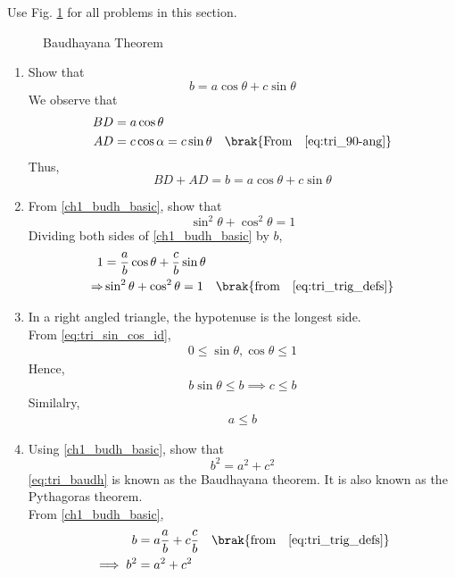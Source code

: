 Use Fig. \ref{fig:tri_baudh} for all problems in this section.
\begin{figure}[!ht]
	\begin{center}
		\resizebox{\columnwidth}{!}{}
	\end{center}
	\caption{Baudhayana Theorem}
	\label{fig:tri_baudh}	
\end{figure}
\renewcommand{\theequation}{\theenumi}
\begin{enumerate}[label=\thesection.\arabic*.,ref=\thesection.\theenumi]

%
\item
Show that 
%
\begin{equation}
\label{ch1_budh_basic}
b = a \cos \theta + c \sin \theta
\end{equation}
%
\solution We observe that
%
\begin{align}
BD &= a \cos \theta \\
AD &= c \cos\alpha = c \sin \theta \quad \brak{\text{From} \quad \eqref{eq:tri_90-ang}
}
\end{align}
%
Thus,
\begin{equation}
BD + AD = b = a \cos \theta + c \sin \theta
\end{equation}
\item
From \eqref{ch1_budh_basic}, show that
%
\begin{equation}
%
\label{eq:tri_sin_cos_id}
\sin ^2 \theta + \cos ^2 \theta = 1
\end{equation}
%
\solution Dividing both sides of \eqref{ch1_budh_basic} by $b$, 
\begin{align}
1 &= \frac{a}{b}\cos\theta + \frac{c}{b}\sin\theta\\
\Rightarrow &\sin ^2 \theta + \cos ^2 \theta = 1 \quad \brak{\text{from} \quad \eqref{eq:tri_trig_defs}}
\end{align}
\item In a right angled triangle, the hypotenuse is the longest side.
\label{them:hyp_largest}
\\
\solution From 
\eqref{eq:tri_sin_cos_id},
\begin{align}
	0 \le \sin \theta, \cos \theta \le 1
\end{align}
Hence, 
\begin{align}
	b \sin \theta \le b \implies  c \le b
\end{align}
Similalry,
\begin{align}
	a \le b
\end{align}

\item
	Using \eqref{ch1_budh_basic}, show that
	\begin{equation}
	\label{eq:tri_baudh}
	b^2 = a^2 + c^2
	\end{equation}
	\eqref{eq:tri_baudh} is known as the Baudhayana theorem.  It is also known as the Pythagoras theorem.
\\
\solution From \eqref{ch1_budh_basic},
\begin{align}
b &= a\frac{a}{b} + c \frac{c}{b} \quad \brak{\text{from} \quad \eqref{eq:tri_trig_defs}}\\
\implies b^2 &= a^2 + c^2
\end{align}
\end{enumerate}
%
\iffalse
